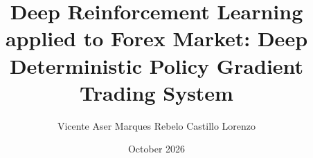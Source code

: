 %
%
\title{Deep Reinforcement Learning applied to Forex Market: Deep Deterministic Policy Gradient Trading System}
%
\author{Vicente Aser Marques Rebelo Castillo Lorenzo}
%
%
\date{October 2026}
%
